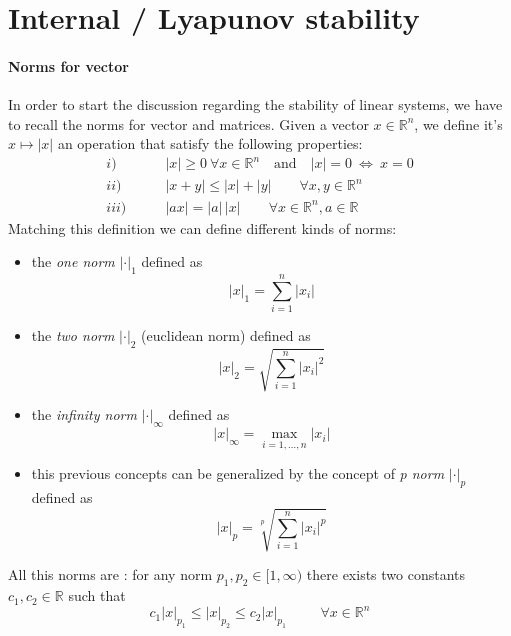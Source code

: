 \section{Internal / Lyapunov stability}
	\paragraph{Norms for vector} In order to start the discussion regarding the stability of linear systems, we have to recall the norms for vector and matrices. Given a vector $x\in \mathds R^n$, we define it's  $x\mapsto |x|$ an operation that satisfy the following properties:
	\begin{align*}
		i) \qquad & |x|\geq 0 \ \forall x\in  \mathds R^n \quad \textrm{and} \quad |x|=0 \ \Leftrightarrow \ x = 0 \\
		ii) \qquad & |x+y| \leq |x|+|y| \qquad \forall x,y\in \mathds R^n \\
		iii) \qquad & |ax| =|a|\, |x| \qquad \forall x\in \mathds R^n,a\in \mathds R 
	\end{align*}
	Matching this definition we can define different kinds of norms:
	\begin{itemize}
		\item the \textit{one norm} $|\cdot|_1$ defined as
		\begin{equation}
			|x|_1 = \sum_{i=1}^{n} |x_i|
		\end{equation}
		\item the \textit{two norm} $|\cdot|_2$ (euclidean norm) defined as
		\begin{equation} \label{eq:lin:euclideannorm}
			|x|_2 = \sqrt{ \sum_{i=1}^n |x_i|^2 }
		\end{equation}
		\item the \textit{infinity norm} $|\cdot|_\infty$ defined as
		\begin{equation}
			|x|_\infty = \max_{i=1,\dots, n} |x_i|
		\end{equation}
		\item this previous concepts can be generalized by the concept of \textit{p norm} $|\cdot|_p$ defined as
		\begin{equation}
			|x|_p = \sqrt[p]{ \sum_{i=1}^n |x_i|^p}
		\end{equation}
	\end{itemize}	
	All this norms are : for any norm $p_1,p_2 \in [1,\infty)$ there exists two constants $c_1,c_2\in \mathds R$ such that
	\[ c_1 |x|_{p_1} \leq |x|_{p_2} \leq c_2 |x|_{p_1} \hspace{1cm} \forall x \in \mathds R^n \]
 
